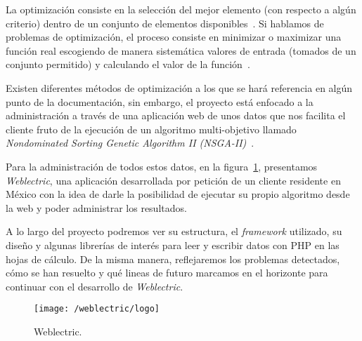 
La optimización consiste en la selección del mejor elemento (con respecto a algún criterio) dentro de un conjunto de elementos disponibles~\cite{wiki:optimizacion}. Si hablamos de problemas de optimización, el proceso consiste en minimizar o maximizar una función real escogiendo de manera sistemática valores de entrada (tomados de un conjunto permitido) y calculando el valor de la función~\cite{wiki:optimizacion}.

Existen diferentes métodos de optimización a los que se hará referencia en algún punto de la documentación, sin embargo, el proyecto está enfocado a la administración a través de una aplicación web de unos datos que nos facilita el cliente fruto de la ejecución de un algoritmo multi-objetivo llamado \textit{Nondominated Sorting Genetic Algorithm II (NSGA-II)}~\cite{pdf:nsga-ii}.

Para la administración de todos estos datos, en la figura~\ref{fig:weblectric}, presentamos \textit{Weblectric}, una aplicación desarrollada por petición de un cliente residente en México con la idea de darle la posibilidad de ejecutar su propio algoritmo desde la web y poder administrar los resultados.

A lo largo del proyecto podremos ver su estructura, el \textit{framework} utilizado, su diseño y algunas librerías de interés para leer y escribir datos con PHP en las hojas de cálculo. De la misma manera, reflejaremos los problemas detectados, cómo se han resuelto y qué lineas de futuro marcamos en el horizonte para continuar con el desarrollo de \textit{Weblectric}. 

\begin{figure}[ht]
	\centering
	\texttt{[image: /weblectric/logo]}
	\caption{Weblectric.}
	\label{fig:weblectric}
\end{figure}
